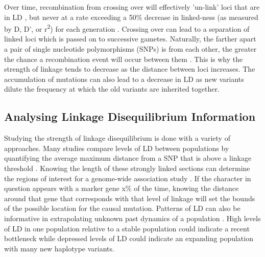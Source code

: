 \documentclass[11pt]{article}
\begin{document}
\begin{linenumbers}
Over time, recombination from crossing over will effectively 'un-link' loci that are in LD \citep{hartl1997principles, slatkin2008linkage}, but never at a rate exceeding a 50\% decrease in linked-ness (as measured by D, D', or r\textsuperscript2) for each generation \citep{weinberg1909vererbungsgesetze}. Crossing over can lead to a separation of linked loci which is passed on to successive gametes. Naturally, the farther apart a pair of single nucleotide polymorphisms (SNPs) is from each other, the greater the chance a recombination event will occur between them \citep{park2012linkage}. This is why the strength of linkage tends to decrease as the distance between loci increases. The accumulation of mutations can also lead to a decrease in LD as new variants dilute the frequency at which the old variants are inherited together.

\subsection{Analysing Linkage Disequilibrium Information}

Studying the strength of linkage disequilibrium is done with a variety of approaches. Many studies compare levels of LD between populations by quantifying the average maximum distance from a SNP that is above a linkage threshold \citep{reich2001linkage, gray2009linkage}. Knowing the length of these strongly linked sections can determine the regions of interest for a genome-wide association study \citep{reich2001linkage, mcrae2005modeling}. If the character in question appears with a marker gene x\% of the time, knowing the distance around that gene that corresponds with that level of linkage will set the bounds of the possible location for the causal mutation. Patterns of LD can also be informative in extrapolating unknown past dynamics of a population \citep{hill1981estimation, hernandez2007demographic, park2012linkage}. High levels of LD in one population relative to a stable population could indicate a recent bottleneck while depressed levels of LD could indicate an expanding population with many new haplotype variants. 


\end{linenumbers}
\end{document}
